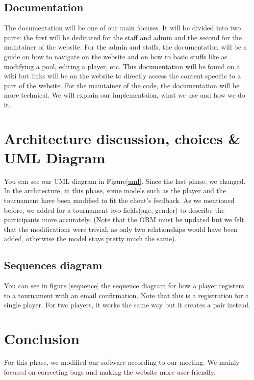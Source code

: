 \documentclass[a4paper, 12pt]{article}
\begin{document}
\subsection{Documentation}
The documentation will be one of our main focuses. It will be divided into two parts: the first will be dedicated for the staff and admin and the second for the maintainer of the website. For the admin and staffs, the documentation will be a guide on how to navigate on the website and on how to basic stuffs like as modifying a pool, editing a player, etc. This documentation will be found on a wiki but links will be on the website to directly access the content specific to a part of the website. For the maintainer of the code, the documentation will be more technical. We will explain our implementaion, what we use and how we do it. 



\newpage
\section{Architecture discussion, choices \& UML Diagram}

You can see our UML diagram in Figure\ref{uml}. Since the last phase, we changed.\\

In the architecture, in this phase, some models such as the player and the tournament have been modified to fit the client's feedback. As we mentioned before, we added for a tournament two fields(age, gender) to describe the participants more accurately. (Note that the ORM must be updated but we felt that the modifications were trivial, as only two relationships would have been added, otherwise the model stays pretty much the same). 

\subsection*{Sequences diagram}

You can see in figure \ref{sequence} the sequence diagram for how a player registers to a tournament with an email confirmation. Note that this is a registration for a single player. For two players, it works the same way but it creates a pair instead. 


\section{Conclusion}

For this phase, we modified our software according to our meeting. We mainly focused on correcting bugs and making the website more user-friendly.
\end{document}
